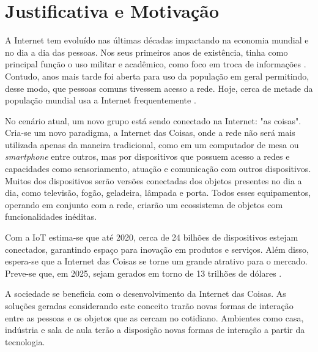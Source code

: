 \section{Justificativa e Motivação}

A Internet tem evoluído nas últimas décadas impactando na economia mundial e no dia a dia das pessoas. Nos seus primeiros anos de existência, tinha como principal função o uso militar e acadêmico, como foco em troca de informações \cite{Leiner2012}. Contudo, anos mais tarde foi aberta para uso da população em geral permitindo, desse modo, que pessoas comuns tivessem acesso a rede. Hoje, cerca de metade da população mundial usa a Internet frequentemente \cite{MiniwattsMarketingGroup2016}. 

No cenário atual, um novo grupo está sendo conectado na Internet: "as coisas". Cria-se um novo paradigma, a Internet das Coisas, onde a rede não será mais utilizada apenas da maneira tradicional, como em um computador de mesa ou \textit{smartphone} entre outros, mas por dispositivos que possuem acesso a redes e capacidades como sensoriamento, atuação e comunicação com outros dispositivos. Muitos dos dispositivos serão versões conectadas dos objetos presentes no dia a dia, como televisão, fogão, geladeira, lâmpada e porta. Todos esses equipamentos, operando em conjunto com a rede, criarão um ecossistema de objetos com funcionalidades inéditas. 

Com a IoT estima-se que até 2020, cerca de 24 bilhões de dispositivos estejam conectados, garantindo espaço para inovação em produtos e serviços. Além disso, espera-se que a Internet das Coisas se torne um grande atrativo para o mercado. Preve-se que, em 2025, sejam gerados em torno de 13 trilhões de dólares \cite{Meola2016}.

A sociedade se beneficia com o desenvolvimento da Internet das Coisas. As soluções geradas considerando este conceito trarão novas formas de interação entre as pessoas e os objetos que as cercam no cotidiano. Ambientes como casa, indústria e sala de aula terão a disposição novas formas de interação a partir da tecnologia. 

